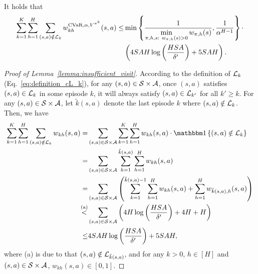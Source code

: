 \begin{lemma} \label{lemma:insufficient_visit}
	It holds that
	\begin{align*}
		\sum_{k=1}^{K} \sum_{h=1}^{H} \sum_{(s,a) \notin \mathcal{L}_k} 
		w^{\textup{CVaR},\alpha,V^{\pi^k}}_{kh}(s,a) \leq & \min \left\{ \frac{ 1 }{\min \limits_{\begin{subarray}{c}\pi,h,s:\  w_{\pi,h}(s)>0\end{subarray}} w_{\pi,h}(s)}, \frac{1}{\alpha^{H-1}} \right\} \cdot \\& \left(  4SAH \log\left( \frac{HSA}{\delta'} \right) + 5SAH  \right) .
	\end{align*}
\end{lemma}
\begin{proof}[Proof of Lemma~\ref{lemma:insufficient_visit}]
	According to the definition of $\mathcal{L}_k$ (Eq.~\eqref{eq:definition_cL_k}), for any $(s,a) \in \mathcal{S} \times \mathcal{A}$, once $(s,a)$ satisfies $(s,a) \in \mathcal{L}_k$ in some episode $k$, it will always satisfy $(s,a) \in \mathcal{L}_{k'}$ for all $k' \geq k$. For any $(s,a) \in \mathcal{S} \times \mathcal{A}$, let $\tilde{k}(s,a)$ denote the last episode $k$ where $(s,a) \notin \mathcal{L}_k$.
	Then, we have
	\begin{align*}
		\sum_{k=1}^{K} \sum_{h=1}^{H} \sum_{(s,a) \notin \cL_k} w_{kh}(s,a) = & \sum_{(s,a) \in \cS \times \cA} \sum_{k=1}^{K} \sum_{h=1}^{H} w_{kh}(s,a) \cdot \indicator{(s,a) \notin \cL_k}
		\\
		= & \sum_{(s,a) \in \cS \times \cA} \sum_{k=1}^{\tilde{k}(s,a)} \sum_{h=1}^{H} w_{kh}(s,a) 
		\\
		= & \sum_{(s,a) \in \cS \times \cA} \sbr{\sum_{k=1}^{\tilde{k}(s,a)-1} \sum_{h=1}^{H} w_{kh}(s,a) + \sum_{h=1}^{H} w_{\tilde{k}(s,a),h}(s,a)}
		\\
		\overset{\textup{(a)}}{<} & \sum_{(s,a) \in \cS \times \cA} \sbr{4H \log \sbr{\frac{HSA}{\delta'}} +4H+H}
		\\
		\leq & 4SAH \log\sbr{\frac{HSA}{\delta'}} + 5SAH ,
	\end{align*}
	where (a) is due to that $(s,a) \notin \mathcal{L}_{\tilde{k}(s,a)}$, and for any $k>0$, $h \in [H]$ and $(s,a) \in \mathcal{S} \times \mathcal{A}$, $w_{kh}(s,a) \in [0,1]$.
	

\end{proof}
